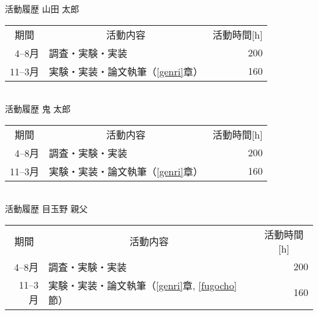 
\thispagestyle{empty}

\begin{table}[tbp]
\large
\centering

{\gtfamily 活動履歴} 山田 太郎\\
\begin{tabular}{rlr}
\hline
\multicolumn{1}{c}{{\gtfamily 期間}}&
\multicolumn{1}{c}{{\gtfamily 活動内容}}&
\multicolumn{1}{c}{{\gtfamily 活動時間[h]}}
\\
4--8月 & 調査・実験・実装 & 200 \\
11--3月 & 実験・実装・論文執筆（\ref{genri}章） & 160\\
\hline
\end{tabular}\\
\vspace{2in}
{\gtfamily 活動履歴} 鬼 太郎\\
\begin{tabular}{rlr}
\hline
\multicolumn{1}{c}{{\gtfamily 期間}}&
\multicolumn{1}{c}{{\gtfamily 活動内容}}&
\multicolumn{1}{c}{{\gtfamily 活動時間[h]}}
\\
4--8月 & 調査・実験・実装 & 200 \\
11--3月 & 実験・実装・論文執筆（\ref{genri}章） & 160\\
\hline
\end{tabular}\\
\vspace{2in}
{\gtfamily 活動履歴} 目玉野 親父\\
\begin{tabular}{rlr}
\hline
\multicolumn{1}{c}{{\gtfamily 期間}}&
\multicolumn{1}{c}{{\gtfamily 活動内容}}&
\multicolumn{1}{c}{{\gtfamily 活動時間[h]}}
\\
4--8月 & 調査・実験・実装 & 200 \\
11--3月 & 実験・実装・論文執筆（\ref{genri}章, \ref{fugocho}節） & 160\\
\hline
\end{tabular}\\
\vspace{2in}
\end{table}
\clearpage
